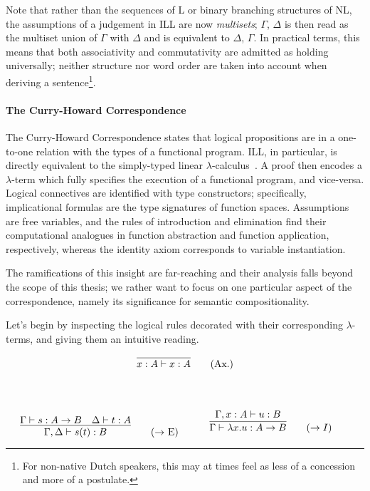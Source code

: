 Note that rather than the sequences of L or binary branching structures of NL, the assumptions of a judgement in ILL are now \textit{multisets}; $\Gamma$, $\Delta$ is then read as the multiset union of $\Gamma$ with $\Delta$ and is equivalent to $\Delta$, $\Gamma$.
In practical terms, this means that both associativity and commutativity are admitted as holding universally; neither structure nor word order are taken into account when deriving a sentence\footnote{For non-native Dutch speakers, this may at times feel as less of a concession and more of a postulate.}.

\paragraph{The Curry-Howard Correspondence}
The Curry-Howard Correspondence states that logical propositions are in a one-to-one relation with the types of a functional program.
ILL, in particular, is directly equivalent to the simply-typed linear $\lambda$-calculus~\cite{benton1993term, abramsky1993computational}.
A proof then encodes a $\lambda$-term which fully specifies the execution of a functional program, and vice-versa.
Logical connectives are identified with type constructors; specifically, implicational formulas are the type signatures of function spaces. 
Assumptions are free variables, and the rules of introduction and elimination find their computational analogues in function abstraction and function application, respectively, whereas the identity axiom corresponds to variable instantiation.

The ramifications of this insight are far-reaching and their analysis falls beyond the scope of this thesis; we rather want to focus on one particular aspect of the correspondence, namely its significance for semantic compositionality.

Let's begin by inspecting the logical rules decorated with their corresponding $\lambda$-terms, and giving them an intuitive reading.

\begin{center}
\begin{minipage}{0.5\textwidth}
\[
\infer{x: A \vdash x: A}{}\tag{Ax.}
\]
\end{minipage}\\
\end{center}
\begin{align*}
    \begin{minipage}{0.5\textwidth}
	\[
        \infer{\Gamma, \Delta \vdash s(t): B}{
            \Gamma \vdash s: A \rightarrow B
            &
            \Delta \vdash t: A
        }\tag{$\rightarrow$ E}
    \]
    \end{minipage}
    \begin{minipage}{0.5\textwidth}
    \[
        \infer{\Gamma \vdash \lambda x. u : A \rightarrow B}{
            \Gamma, x: A \vdash u: B
        }\tag{$\rightarrow I$}\\
    \]
    \end{minipage}
\end{align*}

